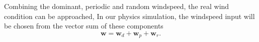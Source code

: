Combining the dominant, periodic and random windspeed, the real wind condition can be approached, In our physics simulation, the windspeed input will be chosen from the vector sum of these components 
\begin{equation}
\boldsymbol{w} = \boldsymbol{w}_d+ \boldsymbol{w}_p + \boldsymbol{w}_r.
\end{equation}






